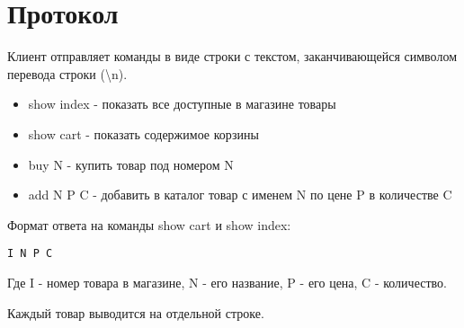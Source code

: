 \documentclass[12pt,a4paper]{report}
\begin{document}
\section{Протокол}
Клиент отправляет команды в виде строки с текстом, заканчивающейся символом перевода строки (\textbackslash n).
\begin{itemize}
\item show index - показать все доступные в магазине товары
\item show cart - показать содержимое корзины
\item buy N - купить товар под номером N
\item add N P C - добавить в каталог товар с именем N по цене P в количестве C
\end{itemize}
Формат ответа на команды show cart и show index:

\begin{verbatim}
I N P C
\end{verbatim}

Где I - номер товара в магазине, N - его название, P - его цена, C - количество.

Каждый товар выводится на отдельной строке.
\end{document}
